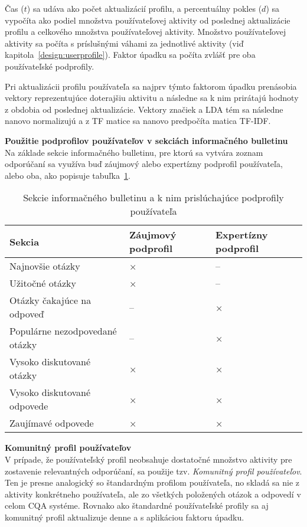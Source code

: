 Čas ($t$) sa udáva ako počet aktualizácií profilu, a percentuálny pokles ($d$)
sa vypočíta ako podiel množstva používateľovej aktivity od poslednej aktualizácie profilu a celkového množstva používateľovej aktivity.
Množstvo používateľovej aktivity sa počíta s príslušnými váhami za jednotlivé aktivity (viď kapitola~\ref{design:userprofile}).
Faktor úpadku sa počíta zvlášť pre oba používateľské podprofily.

Pri aktualizácii profilu používateľa sa najprv týmto faktorom úpadku prenásobia vektory reprezentujúce doterajšiu aktivitu
a následne sa k nim prirátajú hodnoty z obdobia od poslednej aktualizácie. Vektory značiek a LDA tém sa následne nanovo
normalizujú a z TF matice sa nanovo predpočíta matica TF-IDF.

\textbf{Použitie podprofilov používateľov v sekciách informačného bulletinu}\\
Na základe sekcie informačného bulletinu, pre ktorú sa vytvára zoznam odporúčaní sa využíva buď záujmový alebo
expertízny podprofil používateľa, alebo oba, ako popisuje tabuľka~\ref{tab:sections}.

\begin{table}[h]
\label{tab:sections}
\centering
\caption{Sekcie informačného bulletinu a k nim prislúchajúce podprofily používateľa}
\begin{tabular}{|m{7cm}|>{\centering\arraybackslash}m{2.5cm}|>{\centering\arraybackslash}m{2.6cm}|}
\hline
\textbf{Sekcia} & \textbf{Záujmový podprofil} & \textbf{Expertízny podprofil} \\\hline
Najnovšie otázky               & ×  & -- \\\hline
Užitočné otázky                & ×  & -- \\\hline
Otázky čakajúce na odpoveď     & -- & ×  \\\hline
Populárne nezodpovedané otázky & -- & ×  \\\hline
Vysoko diskutované otázky      & ×  & ×  \\\hline
Vysoko diskutované odpovede    & ×  & ×  \\\hline
Zaujímavé odpovede             & ×  & ×  \\\hline
\end{tabular}
\end{table}

\textbf{Komunitný profil používateľov}\\
V prípade, že používateľský profil neobsahuje dostatočné množstvo aktivity pre zostavenie relevantných odporúčaní,
sa použije tzv. \textit{Komunitný profil používateľov}. Ten je presne analogický so štandardným profilom používateľa,
no skladá sa nie z aktivity konkrétneho používateľa, ale zo všetkých položených otázok a odpovedí v celom CQA systéme.
Rovnako ako štandardné používateľské profily sa aj komunitný profil aktualizuje denne a s aplikáciou faktoru úpadku.


